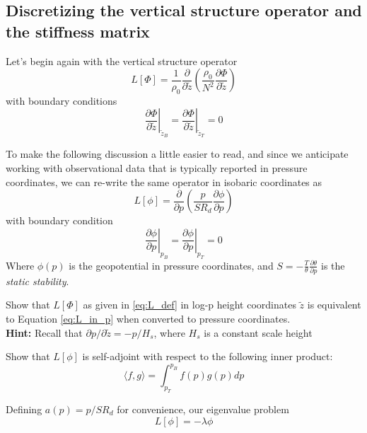 \documentclass{article}
\numberwithin{equation}{section}
\newcommand{\z}{\tilde{z}}
\begin{document}
\subsection{Discretizing the vertical structure operator and the stiffness matrix}

Let's begin again with the vertical structure operator
\begin{equation}
  L[\Phi] = \frac{1}{\rho_0}\frac{\partial}{\partial\z}\left(\frac{\rho_0}{N^2}\frac{\partial\Phi}{\partial\z}\right)
\end{equation}
with boundary conditions
\begin{equation}
 \left. \frac{\partial\Phi}{\partial\z}\right|_{\z_B}=\left. \frac{\partial\Phi}{\partial\z}\right|_{\z_T} = 0
\end{equation}

To make the following discussion a little easier to read, and since we anticipate working with observational data that is typically reported in pressure coordinates, we can re-write the same operator in isobaric coordinates as 
\begin{equation}
  L[\phi] = \frac{\partial}{\partial p}\left(\frac{p}{SR_d}\frac{\partial\phi}{\partial p}\right)
\end{equation}
with boundary condition
\begin{equation}
  \label{eq:L_in_p}
 \left. \frac{\partial\phi}{\partial p}\right|_{p_B}=\left. \frac{\partial\phi}{\partial p}\right|_{p_T} = 0
\end{equation}
Where $\phi(p)$ is the geopotential in pressure coordinates, and $S=-\frac{T}{\theta}\frac{\partial \theta}{\partial p}$ is the \textit{static stability}. 

\begin{exercise}
  Show that $L[\Phi]$ as given in \eqref{eq:L_def} in log-p height coordinates $\z$ is equivalent to Equation \ref{eq:L_in_p} when converted to pressure coordinates. 
  \\
  \textbf{Hint:} Recall that $\partial p / \partial \z = - p/H_s$, where $H_s$ is a constant scale height
\end{exercise}

\begin{exercise}
  Show that $L[\phi]$ is self-adjoint with respect to the following inner product:
  $$
  \langle f, g\rangle = \int_{p_T}^{p_B}f(p)g(p)dp
  $$
\end{exercise}

Defining $a(p)=p/SR_d$ for convenience, our eigenvalue problem 
$$
L[\phi]=-\lambda \phi
$$
\end{document}
